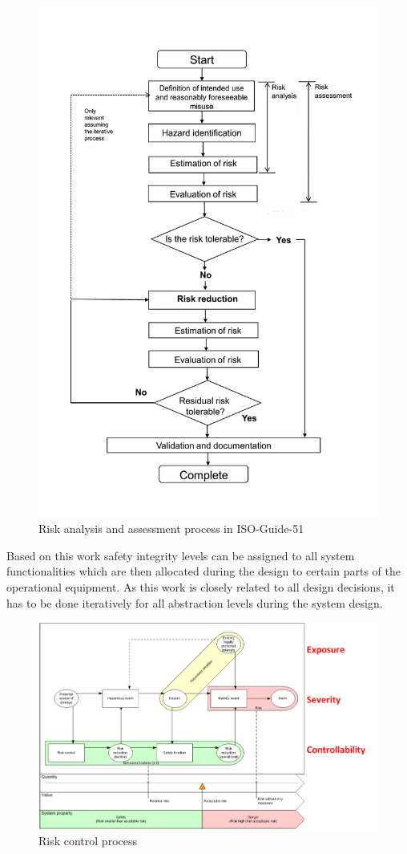 \documentclass{template/openetcs_report}
\begin{document}
\begin{figure}[htbp]
\centering
\includegraphics[width=0.9\linewidth]{ISO-Guide-51-risk-analysis-and-assessment}
\caption{Risk analysis and assessment process in ISO-Guide-51}
\label{fig:risk-analysis}
\end{figure}


Based on this work safety integrity levels can be assigned to all system functionalities which are then allocated during the design to certain parts of the operational equipment. As this work is closely related to all design decisions, it has to be done iteratively for all abstraction levels during the system design. 

\begin{figure}[htbp]
\centering
\includegraphics[width=0.9\linewidth]{bld_2013-06-19_Risk-control-modell_1-0_jw}
\caption{Risk control process \cite{Schnieder.2013}}
\label{fig:Risk-control-modell-eng}
\end{figure}
\end{document}
